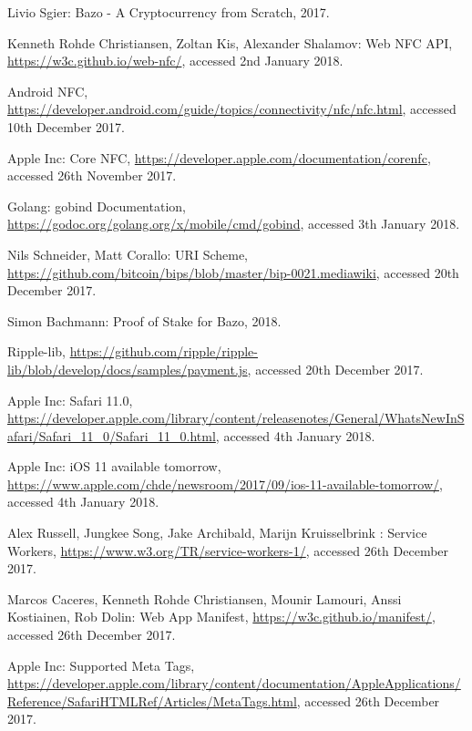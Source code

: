 \begin{thebibliography}{99}

 Livio Sgier: Bazo - A Cryptocurrency from Scratch, 2017.

 Kenneth Rohde Christiansen, Zoltan Kis, Alexander Shalamov: Web NFC API, \url{https://w3c.github.io/web-nfc/}, accessed 2nd January 2018.


 Android NFC, \url{https://developer.android.com/guide/topics/connectivity/nfc/nfc.html}, accessed 10th December 2017.

 Apple Inc: Core NFC, \url{https://developer.apple.com/documentation/corenfc}, accessed 26th November 2017.

 Golang: gobind Documentation, \url{https://godoc.org/golang.org/x/mobile/cmd/gobind}, accessed 3th January 2018.

 Nils Schneider, Matt Corallo: URI Scheme, \url{https://github.com/bitcoin/bips/blob/master/bip-0021.mediawiki}, accessed 20th December 2017.

 Simon Bachmann: Proof of Stake for Bazo, 2018.

 Ripple-lib, \url{https://github.com/ripple/ripple-lib/blob/develop/docs/samples/payment.js}, accessed 20th December 2017.

 Apple Inc: Safari 11.0,   \url{https://developer.apple.com/library/content/releasenotes/General/WhatsNewInSafari/Safari_11_0/Safari_11_0.html}, accessed 4th January 2018.

 Apple Inc: iOS 11 available tomorrow,  \url{https://www.apple.com/chde/newsroom/2017/09/ios-11-available-tomorrow/}, accessed 4th January 2018.

 Alex Russell, Jungkee Song, Jake Archibald, Marijn Kruisselbrink : Service Workers, \url{https://www.w3.org/TR/service-workers-1/}, accessed 26th December 2017.

 Marcos Caceres, 
Kenneth Rohde Christiansen, Mounir Lamouri, Anssi Kostiainen, Rob Dolin: Web App Manifest, \url{https://w3c.github.io/manifest/}, accessed 26th December 2017.

 Apple Inc: Supported Meta Tags,  \url{https://developer.apple.com/library/content/documentation/AppleApplications/Reference/SafariHTMLRef/Articles/MetaTags.html}, accessed 26th December 2017.


\end{thebibliography}

